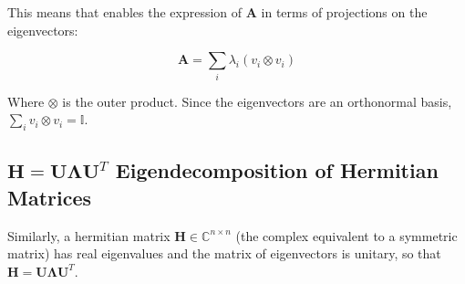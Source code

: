 This means that  enables the expression of $\mathbf{A}$ in terms of projections on the eigenvectors:

\begin{equation}
\mathbf{A} = \sum_i \lambda_i (v_i \otimes v_i)
\end{equation}

Where $\otimes$ is the outer product. Since the eigenvectors are an orthonormal basis, $\sum_i v_i \otimes v_i = \mathbb{I}$.


\subsection{$\mathbf{H} = \mathbf{U\Lambda U}^T$ Eigendecomposition of Hermitian Matrices}

Similarly, a hermitian matrix $\mathbf{H} \in \mathbb{C}^{n\times n}$ (the complex equivalent to a symmetric matrix) has real eigenvalues and the matrix of eigenvectors is unitary, so that $\mathbf{H} = \mathbf{U\Lambda U}^T$.

